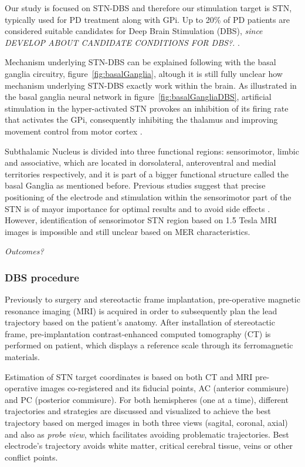 Our study is focused on STN-DBS and therefore our stimulation target is STN, typically used for PD treatment along with GPi. Up to 20\% of PD patients are considered suitable candidates for Deep Brain Stimulation (DBS),\textit{ since DEVELOP ABOUT CANDIDATE CONDITIONS FOR DBS?.} \cite{WagleShukla2014}.


Mechanism underlying STN-DBS can be explained following with the basal ganglia circuitry, figure~\ref{fig:basalGanglia}, altough it is still fully unclear how mechanism underlying STN-DBS exactly work within the brain. As illustrated in the basal ganglia neural network in figure~\ref{fig:basalGangliaDBS}, artificial stimulation in the hyper-activated STN provokes an inhibition of its firing rate that activates the GPi, consequently inhibiting the thalamus and improving movement control from motor cortex \cite{Maiti2017, Gradinaru2009, Negida2018}.

Subthalamic Nucleus is divided into three functional regions: sensorimotor, limbic and associative, which are located in dorsolateral, anteroventral and medial territories respectively, and it is part of a bigger functional structure called the basal Ganglia as mentioned before. Previous studies suggest that precise positioning of the electrode and stimulation within the sensorimotor part of the STN is of mayor importance for optimal results and to avoid side effects \cite{Castrioto2014, Wodarg2012, Johnsen2010}. However, identification of sensorimotor STN region based on 1.5 Tesla MRI images is impossible and still unclear based on MER characteristics.

\textit{Outcomes?}

\subsubsection{DBS procedure}
Previously to surgery and stereotactic frame implantation, pre-operative magnetic resonance imaging (MRI) is acquired in order to subsequently plan the lead trajectory based on the patient's anatomy. After installation of stereotactic frame, pre-implantation contrast-enhanced computed tomography (CT) is performed on patient, which displays a reference scale through its ferromagnetic materials.

Estimation of STN target coordinates is based on both CT and MRI pre-operative images co-registered and its fiducial points, AC (anterior commisure) and PC (posterior commisure).  For both hemispheres (one at a time), different trajectories and strategies are discussed and visualized to achieve the best trajectory based on merged images in both three views (sagital, coronal, axial) and also as \textit{probe view}, which facilitates avoiding problematic trajectories. Best electrode's trajectory avoids white matter, critical cerebral tissue, veins or other conflict points.

